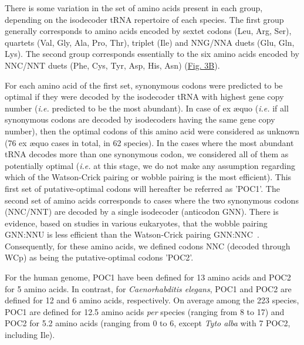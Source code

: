 There is some variation in the set of amino acids present in each group, depending on the isodecoder tRNA repertoire of each species. The first group generally corresponds to amino acids encoded by sextet codons (Leu, Arg, Ser), quartets (Val, Gly, Ala, Pro, Thr), triplet (Ile) and NNG/NNA duets (Glu, Gln, Lys). The second group corresponds essentially to the six amino acids encoded by NNC/NNT duets (Phe, Cys, Tyr, Asp, His, Asn) (\hyperref[fig:CU3]{Fig. 3B}).

For each amino acid of the first set, synonymous codons were predicted to be optimal if they were decoded by the isodecoder tRNA with highest gene copy number (\textit{i.e.} predicted to be the most abundant). In case of ex æquo (\textit{i.e.} if all synonymous codons are decoded by isodecoders having the same gene copy number), then the optimal codons of this amino acid were considered as unknown (76 ex æquo cases in total, in 62 species). In the cases where the most abundant tRNA decodes more than one synonymous codon, we considered all of them as potentially optimal (\textit{i.e.} at this stage, we do not make any assumption regarding which of the Watson-Crick pairing or wobble pairing is the most efficient). This first set of putative-optimal codons will hereafter be referred as 'POC1'.
The second set of amino acids corresponds to cases where the two synonymous codons (NNC/NNT) are decoded by a single isodecoder (anticodon GNN). There is evidence, based on studies in various eukaryotes, that the wobble pairing GNN:NNU is less efficient than the Watson-Crick pairing GNN:NNC~\citep{stadler_wobble_2011, chan_frequent_2017, wang_accurate_2017}. Consequently, for these amino acids, we defined codons NNC (decoded through WCp) as being the putative-optimal codons 'POC2'.

For the human genome, POC1 have been defined for 13 amino acids and POC2 for 5 amino acids. In contrast, for \textit{Caenorhabditis elegans}, POC1 and POC2 are defined for 12 and 6 amino acids, respectively. On average among the 223 species, POC1 are defined for 12.5 amino acids \textit{per} species (ranging from 8 to 17) and POC2 for 5.2 amino acids (ranging from 0 to 6, except \textit{Tyto alba} with 7 POC2, including Ile).

